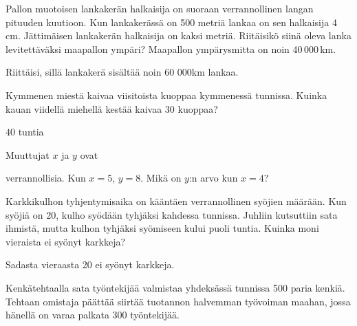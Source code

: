 \begin{tehtavasivu}
\begin{tehtava}
Pallon muotoisen lankakerän halkaisija on suoraan verrannollinen langan pituuden kuutioon. Kun lankakerässä on 500 metriä lankaa on sen halkaisija 4 cm. Jättimäisen lankakerän halkaisija on kaksi metriä. Riitäisikö siinä oleva lanka levitettäväksi maapallon ympäri? Maapallon ympärysmitta on noin 40\,000\,km.
\begin{vastaus}
Riittäisi, sillä lankakerä sisältää noin 60 000km lankaa.
\end{vastaus}
\end{tehtava}

\begin{tehtava}
	Kymmenen miestä kaivaa viisitoista kuoppaa kymmenessä tunnissa.
	Kuinka kauan viidellä miehellä kestää kaivaa $30$ kuoppaa?	
	\begin{vastaus}
		$40$ tuntia
	\end{vastaus}
\end{tehtava}

\begin{tehtava}
	Muuttujat $x$ ja $y$ ovat
	\begin{alakohdatrivi}
	\end{alakohdatrivi}
	verrannollisia. Kun $x = 5$, $y = 8$. Mikä on $y$:n arvo kun $x = 4$?
	\begin{vastaus}
		\begin{alakohdat}
		\end{alakohdat}
	\end{vastaus}
\end{tehtava}

\begin{tehtava}
	Karkkikulhon tyhjentymisaika on kääntäen verrannollinen syöjien määrään. Kun syöjiä on 20, kulho syödään tyhjäksi kahdessa tunnissa. Juhliin kutsuttiin sata ihmistä, mutta kulhon tyhjäksi syömiseen kului puoli tuntia. Kuinka moni vieraista ei syönyt karkkeja?
	\begin{vastaus}
		Sadasta vieraasta 20 ei syönyt karkkeja.
	\end{vastaus}
\end{tehtava}

\begin{tehtava}
Kenkätehtaalla sata työntekijää valmistaa yhdeksässä tunnissa 500 paria kenkiä. Tehtaan omistaja päättää siirtää tuotannon halvemman työvoiman maahan, jossa hänellä on varaa palkata 300 työntekijää. 


\end{tehtava}
\end{tehtavasivu}
